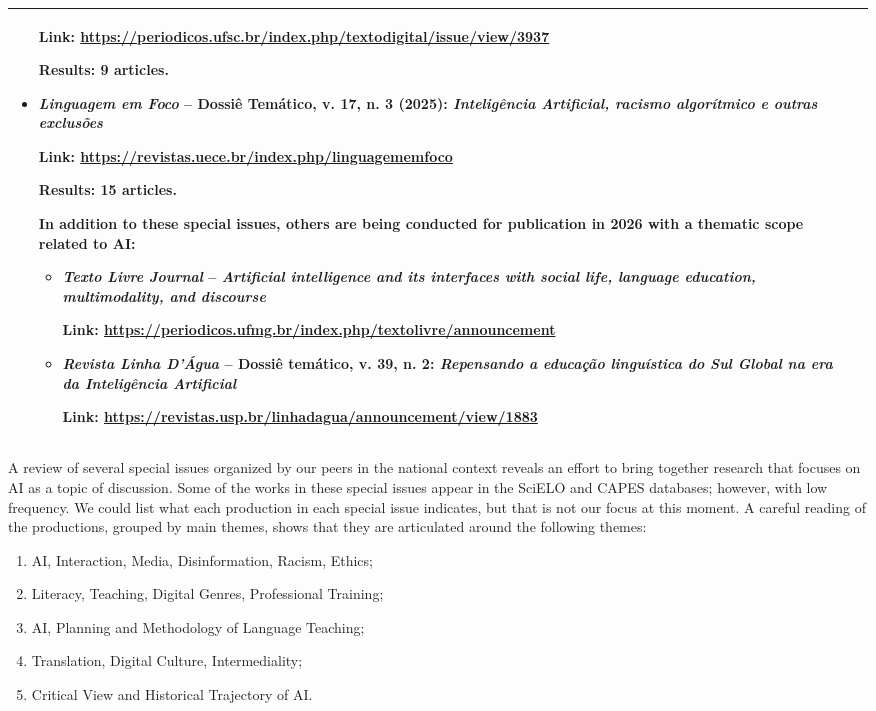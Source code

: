 \documentclass[english]{textolivre}
\begin{document}
\begin{table}[htbp]
\begin{threeparttable}
\begin{tabularx}{\textwidth}{p{1cm}X}
\begin{itemize}
Link: \url{https://periodicos.ufsc.br/index.php/textodigital/issue/view/3937}

Results: 9 articles.

\item \textit{Linguagem em Foco} -- Dossiê Temático, v. 17, n. 3 (2025): \textit{Inteligência Artificial, racismo algorítmico e outras exclusões}

Link: \url{https://revistas.uece.br/index.php/linguagememfoco}

Results: 15 articles.

\medskip

In addition to these special issues, others are being conducted for publication in 2026 with a thematic scope related to AI:

\begin{itemize}
\item \textit{Texto Livre Journal} -- \textit{Artificial intelligence and its interfaces with social life, language education, multimodality, and discourse}

Link: \url{https://periodicos.ufmg.br/index.php/textolivre/announcement}

\item \textit{Revista Linha D'Água} -- Dossiê temático, v. 39, n. 2: \textit{Repensando a educação linguística do Sul Global na era da Inteligência Artificial}

Link: \url{https://revistas.usp.br/linhadagua/announcement/view/1883}
\end{itemize}

\end{itemize}
\\
\hline

\end{tabularx}
\end{threeparttable}
\end{table}

A review of several special issues organized by our peers in the national context reveals an effort to bring together research that focuses on AI as a topic of discussion. Some of the works in these special issues appear in the SciELO and CAPES databases; however, with low frequency. We could list what each production in each special issue indicates, but that is not our focus at this moment. A careful reading of the productions, grouped by main themes, shows that they are articulated around the following themes:

\begin{enumerate}
    \item AI, Interaction, Media, Disinformation, Racism, Ethics;
    \item Literacy, Teaching, Digital Genres, Professional Training;
    \item AI, Planning and Methodology of Language Teaching;
    \item Translation, Digital Culture, Intermediality;
    \item Critical View and Historical Trajectory of AI.
\end{enumerate}
\end{document}
